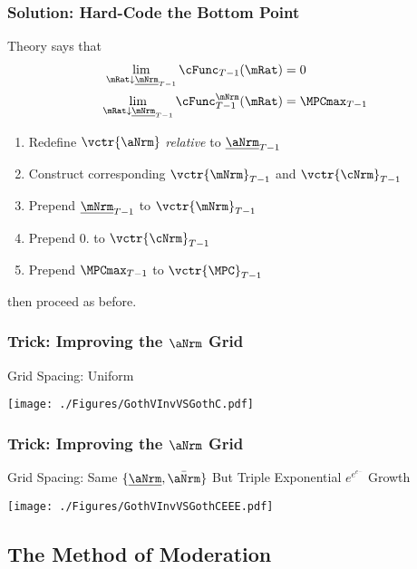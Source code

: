 \documentclass{beamer}
\begin{document}
\begin{frame}
\frametitle{Solution: Hard-Code the Bottom Point}

Theory says that
\begin{equation}\begin{gathered}\begin{aligned}
  \lim_{\mRat \downarrow \underline{\mNrm}_{T-1}} \cFunc_{T-1}(\mRat)  & = 0
\\ \lim_{\mRat \downarrow \underline{\mNrm}_{T-1}} \cFunc_{T-1}^{\mNrm}(\mRat)  & = \MPCmax_{T-1}
\end{aligned}\end{gathered}\end{equation}

\medskip 

\begin{enumerate}
\item Redefine $\vctr{\aNrm}$ {\it relative} to $\underline{\aNrm}_{T-1}$
\item Construct corresponding $\vctr{\mNrm}_{T-1}$ and $\vctr{\cNrm}_{T-1}$
\item Prepend $\underline{\mNrm}_{T-1}$ to $\vctr{\mNrm}_{T-1}$
\item Prepend $0.$ to $\vctr{\cNrm}_{T-1}$
\item Prepend $\MPCmax_{T-1}$ to $\vctr{\MPC}_{T-1}$
\end{enumerate}
then proceed as before.

\end{frame}

\begin{frame}
\frametitle{Trick: Improving the $\aNrm$ Grid}
Grid Spacing: Uniform

\texttt{[image: ./Figures/GothVInvVSGothC.pdf]}

\end{frame}


\begin{frame}
\frametitle{Trick: Improving the $\aNrm$ Grid}
Grid Spacing: Same $\{\underline{\aNrm},\bar{\aNrm}\}$ But Triple Exponential $e^{e^{e^{...}}}$ Growth

\texttt{[image: ./Figures/GothVInvVSGothCEEE.pdf]}

\end{frame}


\subsection{The Method of Moderation}
\end{document}
